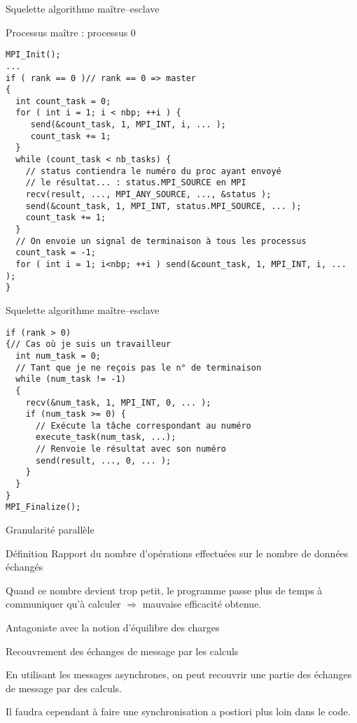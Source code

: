 \documentclass[handout]{beamer}
\begin{document}
\begin{frame}[fragile]{Squelette algorithme maître--esclave}

Processus maître : processus 0

\begin{lstlisting}
MPI_Init();
...
if ( rank == 0 )// rank == 0 => master
{
  int count_task = 0;
  for ( int i = 1; i < nbp; ++i ) {
     send(&count_task, 1, MPI_INT, i, ... );     
     count_task += 1;
  }
  while (count_task < nb_tasks) {
    // status contiendra le numéro du proc ayant envoyé
    // le résultat... : status.MPI_SOURCE en MPI
    recv(result, ..., MPI_ANY_SOURCE, ..., &status );
    send(&count_task, 1, MPI_INT, status.MPI_SOURCE, ... );     
    count_task += 1;    
  }
  // On envoie un signal de terminaison à tous les processus
  count_task = -1;
  for ( int i = 1; i<nbp; ++i ) send(&count_task, 1, MPI_INT, i, ... );
}
\end{lstlisting}
\end{frame}

\begin{frame}[fragile]{Squelette algorithme maître--esclave}

\begin{lstlisting}
if (rank > 0)
{// Cas où je suis un travailleur
  int num_task = 0;
  // Tant que je ne reçois pas le n° de terminaison
  while (num_task != -1)
  {
    recv(&num_task, 1, MPI_INT, 0, ... );
    if (num_task >= 0) {
      // Exécute la tâche correspondant au numéro
      execute_task(num_task, ...);
      // Renvoie le résultat avec son numéro 
      send(result, ..., 0, ... );
    }
  }
}
MPI_Finalize();
\end{lstlisting}
\end{frame}

\begin{frame}[fragile]{Granularité parallèle}


\begin{block}{Définition}
Rapport du nombre d'opérations effectuées sur le nombre de données
échangés
\end{block}

Quand ce nombre devient trop petit, le programme passe plus de temps à
communiquer qu'à calculer $\Rightarrow$ mauvaise efficacité obtenue.

Antagoniste avec la notion d'équilibre des charges
\end{frame}

\begin{frame}[fragile]{Recouvrement des échanges de message par les calculs}

En utilisant les messages asynchrones, on peut recouvrir une partie des
échanges de message par des calculs.

Il faudra cependant à faire une synchronisation a postiori plus loin dans
le code.

\end{frame}
\end{document}
